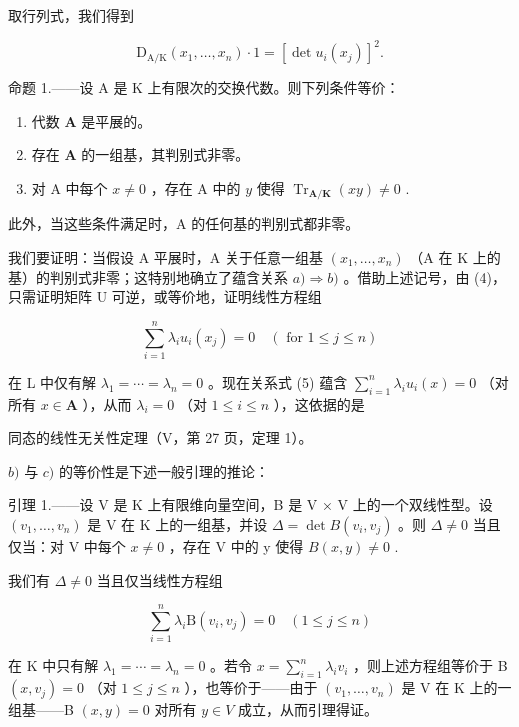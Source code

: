 取行列式，我们得到

\[
\mathrm{D} _ {\mathrm{A} / \mathrm{K}} (x _ {1}, \dots , x _ {n}) \cdot 1 = [ \det u _ {i} (x _ {j}) ] ^ {2}.\tag{4}
\]

命题 1.——设 A 是 K 上有限次的交换代数。则下列条件等价：

\begin{enumerate}
\def\labelenumi{\alph{enumi})}
\item
  代数 \(\mathbf{A}\) 是平展的。
\item
  存在 \(\mathbf{A}\) 的一组基，其判别式非零。
\item
  对 A 中每个 \(x \neq 0\) ，存在 A 中的 \(y\) 使得 \(\operatorname{Tr}_{\mathbf{A} / \mathbf{K}}(xy) \neq 0\) .
\end{enumerate}

此外，当这些条件满足时，A 的任何基的判别式都非零。

我们要证明：当假设 A 平展时，A 关于任意一组基 \((x_{1},\ldots,x_{n})\) （A 在 K 上的基）的判别式非零；这特别地确立了蕴含关系 \(a)\Rightarrow b)\) 。借助上述记号，由 (4)，只需证明矩阵 U 可逆，或等价地，证明线性方程组

\[
\sum_ {i = 1} ^ {n} \lambda_ {i} u _ {i} (x _ {j}) = 0 \quad (\text { for } 1 \leqslant j \leqslant n)\tag{5}
\]

在 L 中仅有解 \(\lambda_{1} = \cdots = \lambda_{n} = 0\) 。现在关系式 (5) 蕴含 \(\sum_{i=1}^{n} \lambda_{i} u_{i}(x) = 0\) （对所有 \(x \in \mathbf{A}\) ），从而 \(\lambda_{i} = 0\) （对 \(1 \leqslant i \leqslant n\) ），这依据的是

同态的线性无关性定理（V，第 27 页，定理 1）。

\(b)\) 与 \(c)\) 的等价性是下述一般引理的推论：

引理 1.——设 V 是 K 上有限维向量空间，B 是 V × V 上的一个双线性型。设 \((v_{1}, \ldots, v_{n})\) 是 V 在 K 上的一组基，并设 \(\Delta = \det B(v_{i}, v_{j})\) 。则 \(\Delta \neq 0\) 当且仅当：对 V 中每个 \(x \neq 0\) ，存在 V 中的 y 使得 \(B(x, y) \neq 0\) .

我们有 \(\Delta \neq 0\) 当且仅当线性方程组

\[
\sum_ {i = 1} ^ {n} \lambda_ {i} \mathrm{B} (v _ {i}, v _ {j}) = 0 \quad (1 \leqslant j \leqslant n)
\]

在 K 中只有解 \(\lambda_1 = \cdots = \lambda_n = 0\) 。若令 \(x = \sum_{i=1}^{n} \lambda_i v_i\) ，则上述方程组等价于 B \((x, v_j) = 0\) （对 \(1 \leqslant j \leqslant n\) ），也等价于——由于 \((v_1, \ldots, v_n)\) 是 V 在 K 上的一组基——B \((x, y) = 0\) 对所有 \(y \in V\) 成立，从而引理得证。

